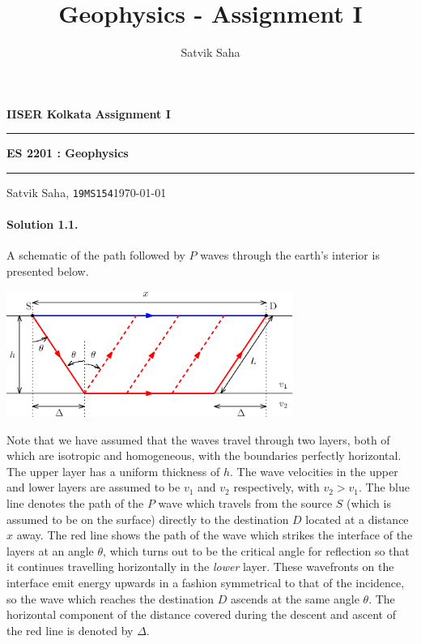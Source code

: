 \documentclass[10pt]{article}
\title{Geophysics - Assignment I}
\author{Satvik Saha}
\date{}
\begin{document}
    \noindent\textbf{IISER Kolkata} \hfill \textbf{Assignment I}
    \vspace{3pt}
    \hrule
    \vspace{3pt}
    \begin{center}
        \LARGE{\textbf{ES 2201 : Geophysics}}
    \end{center}
    \vspace{3pt}
    \hrule
    \vspace{3pt}
    Satvik Saha, \texttt{19MS154}\hfill\today
    \vspace{20pt}

    \paragraph{Solution 1.1.} A schematic of the path followed by $P$ waves
    through the earth's interior is presented below.
    \begin{center}
        \includegraphics[width=0.7\textwidth]{./seismic_refraction.eps}
    \end{center}
    Note that we have assumed that the waves travel through two layers, both of
    which are isotropic and homogeneous, with the boundaries perfectly horizontal.
    The upper layer has a uniform thickness of $h$.  The wave velocities in the
    upper and lower layers are assumed to be $v_1$ and $v_2$ respectively, with $v_2
    > v_1$. The blue line denotes the path of the $P$ wave which travels from the
    source $S$ (which is assumed to be on the surface) directly to the destination
    $D$ located at a distance $x$ away. The red line shows the path of the wave
    which strikes the interface of the layers at an angle $\theta$, which turns out
    to be the critical angle for reflection so that it continues travelling
    horizontally in the \textit{lower} layer. These wavefronts on the interface emit
    energy upwards in a fashion symmetrical to that of the incidence, so the wave
    which reaches the destination $D$ ascends at the same angle $\theta$.  The
    horizontal component of the distance covered during the descent and ascent of
    the red line is denoted by $\Delta$.
\end{document}
